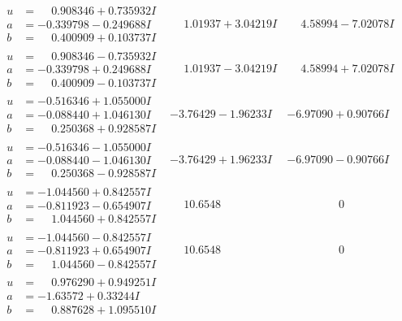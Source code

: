 \documentclass[1p]{elsarticle_modified}
\theoremstyle{definition}
\begin{document}
$$\begin{array}{c|c|c}
\begin{aligned}
u &= \phantom{-}0.908346 + 0.735932 I \\
a &= -0.339798 - 0.249688 I \\
b &= \phantom{-}0.400909 + 0.103737 I\end{aligned}
 & \phantom{-}1.01937 + 3.04219 I & \phantom{-}4.58994 - 7.02078 I \\ \hline\begin{aligned}
u &= \phantom{-}0.908346 - 0.735932 I \\
a &= -0.339798 + 0.249688 I \\
b &= \phantom{-}0.400909 - 0.103737 I\end{aligned}
 & \phantom{-}1.01937 - 3.04219 I & \phantom{-}4.58994 + 7.02078 I \\ \hline\begin{aligned}
u &= -0.516346 + 1.055000 I \\
a &= -0.088440 + 1.046130 I \\
b &= \phantom{-}0.250368 + 0.928587 I\end{aligned}
 & -3.76429 - 1.96233 I & -6.97090 + 0.90766 I \\ \hline\begin{aligned}
u &= -0.516346 - 1.055000 I \\
a &= -0.088440 - 1.046130 I \\
b &= \phantom{-}0.250368 - 0.928587 I\end{aligned}
 & -3.76429 + 1.96233 I & -6.97090 - 0.90766 I \\ \hline\begin{aligned}
u &= -1.044560 + 0.842557 I \\
a &= -0.811923 - 0.654907 I \\
b &= \phantom{-}1.044560 + 0.842557 I\end{aligned}
 & \phantom{-}10.6548\phantom{ +0.000000I} & \phantom{-0.000000 } 0 \\ \hline\begin{aligned}
u &= -1.044560 - 0.842557 I \\
a &= -0.811923 + 0.654907 I \\
b &= \phantom{-}1.044560 - 0.842557 I\end{aligned}
 & \phantom{-}10.6548\phantom{ +0.000000I} & \phantom{-0.000000 } 0 \\ \hline\begin{aligned}
u &= \phantom{-}0.976290 + 0.949251 I \\
a &= -1.63572 + 0.33244 I \\
b &= \phantom{-}0.887628 + 1.095510 I\end{aligned}

\end{array}$$
\end{document}
